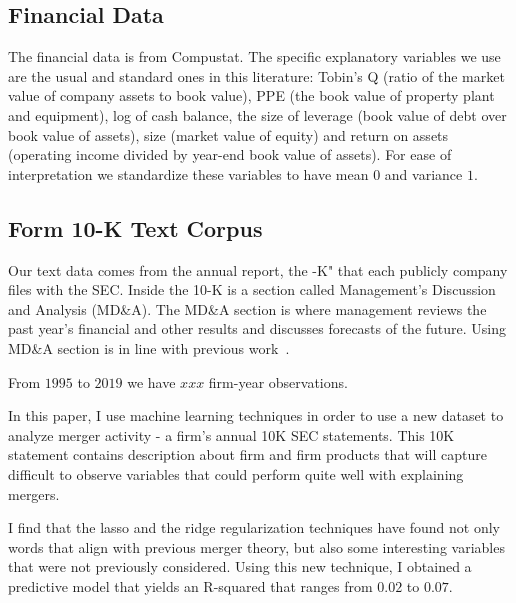 \documentclass[11pt]{article}
\begin{document}
\subsection{Financial Data}\label{sec:financial}

The financial data is from Compustat. The specific explanatory variables we use are the
usual and standard ones in this literature: Tobin's Q (ratio of the
market value of company assets to book value), PPE (the book value of
property plant and equipment), log of cash balance, the size of leverage (book value of debt over book value of assets), size (market value
of equity) and return on assets (operating income divided by year-end book value of assets).
For ease of interpretation we standardize these variables to have mean $0$ and variance $1$.

\subsection{Form 10-K Text Corpus}\label{sec:10k}

Our text data comes from the annual report, the -K" that each
publicly company files with the SEC. Inside the 10-K is a section called Management's Discussion and Analysis
(MD\&A). The MD\&A section is where management reviews the past year's financial and other results and discusses forecasts
of the future. Using MD\&A section is in line with previous work~\cite{routledge2013}.

From $1995$ to $2019$ we have $xxx$ firm-year
observations. 






In this paper, I use machine learning techniques in order to use a new dataset to analyze
merger activity - a firm’s annual 10K SEC statements. This 10K statement contains description
about firm and firm products that will capture difficult to observe
variables that could perform quite well with explaining mergers.

I find that the lasso and the ridge regularization techniques have found not only words that align with previous merger theory, but also some interesting
variables that were not previously considered. Using this new technique, I obtained a predictive
model that yields an R-squared that ranges from $0.02$ to $0.07$.
\end{document}
